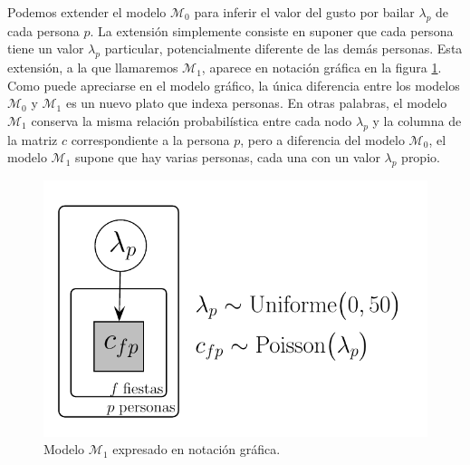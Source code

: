\documentclass{article}
\begin{document}
\indent Podemos extender el modelo $\mathcal M_0$ para inferir el valor del gusto por bailar $\lambda_p$ de cada persona $p$. La extensión simplemente consiste en suponer que cada persona tiene un valor $\lambda_p$ particular, potencialmente diferente de las demás personas. Esta extensión, a la que llamaremos $\mathcal M_1$, aparece en notación gráfica en la figura \ref{fig:m_1}. Como puede apreciarse en el modelo gráfico, la única diferencia entre los modelos $\mathcal M_0$ y $\mathcal M_1$ es un nuevo plato que indexa personas. En otras palabras, el modelo $\mathcal M_1$ conserva la misma relación probabilística entre cada nodo $\lambda_p$ y la columna de la matriz $c$ correspondiente a la persona $p$, pero a diferencia del modelo $\mathcal M_0$, el modelo $\mathcal M_1$ supone que hay varias personas, cada una con un valor $\lambda_p$ propio.

\begin{figure}[H]
\centerline{\includegraphics[width=.65\textwidth]{m_1.pdf}}
\caption{Modelo $\mathcal M_1$ expresado en notación gráfica.}
\label{fig:m_1}
\end{figure}
\end{document}

